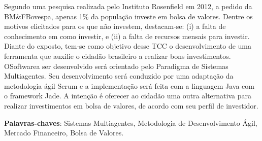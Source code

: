 \begin{resumo}
 


 \vspace{\onelineskip}
    Segundo uma pesquisa realizada pelo Instituto Rosenfield em 2012, a pedido da BM\&FBovespa, apenas 1\% da população investe em bolsa de valores. Dentre os motivos elicitados para os que não investem, destacam-se: (i) a falta de conhecimento em como investir, e (ii) a falta de recursos mensais para investir. Diante do exposto, tem-se como objetivo desse TCC o desenvolvimento de uma ferramenta que auxilie o cidadão brasileiro a realizar bons investimentos. OSoftwarea ser desenvolvido será orientado pelo Paradigma de Sistemas Multiagentes. Seu desenvolvimento será conduzido por uma adaptação da metodologia ágil Scrum e a implementação será feita com a linguagem Java com o framework Jade. A intenção é oferecer ao cidadão uma outra alternativa para realizar investimentos em bolsa de valores, de acordo com seu perfil de investidor.

    
 \noindent
 \textbf{Palavras-chaves}: Sistemas Multiagentes, Metodologia de Desenvolvimento Ágil, Mercado Financeiro, Bolsa de Valores.
\end{resumo}
